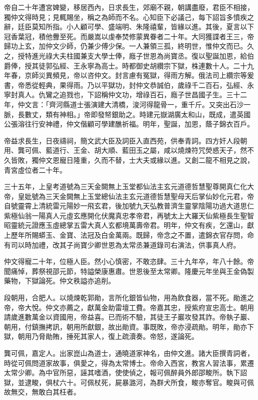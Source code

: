 \begin{pinyinscope}
帝自二十年遭宮婢變，移居西內，日求長生，郊廟不親，朝講盡廢，君臣不相接，獨仲文得時見；見輒賜坐，稱之為師而不名。心知臣下必議己，每下詔旨多憤疾之辭，廷臣莫知所指。小人顧可學、盛端明、朱隆禧輩，皆緣以進。其後，夏言以下冠香葉冠，積他釁至死。而嚴嵩以虔奉焚修蒙異眷者二十年。大同獲諜者王三，帝歸功上玄，加仲文少師，仍兼少傅少保。一人兼領三孤，終明世，惟仲文而已。久之，授特進光祿大夫柱國兼支大學士俸，廕子世恩為尚寶丞。復以聖誕加恩，給伯爵俸，授其徒郭弘經、王永寧為高士。時都御史胡纘宗下獄，株連數十人。二十九年春，京師災異頻見，帝以咨仲文。封言慮有冤獄，得雨方解。俄法司上纘宗等爰書，帝悉從輕典，果得雨。乃以平獄功，封仲文恭誠伯，歲祿千二百石，弘經、永寧封真人。仇鸞之追戮也，下詔稱仲文功，增祿百石，廕子世昌國子生。三十二年，仲文言：「齊河縣道士張演建大清橋，浚河得龍骨一，重千斤。又突出石沙一脈，長數丈，類有神相。」帝即發帑銀助之。時建元嶽湖廣太和山，既成，遣英國公張溶往行安神禮，仲文偕顧可學建醮祈福。明年，聖誕，加恩，蔭子錦衣百戶。

帝益求長生，日夜禱祠，簡文武大臣及詞臣入直西苑，供奉青詞。四方奸人段朝用、龔可佩、藍道行、王金、胡大順、藍田玉之屬，咸以燒煉符咒熒惑天子，然不久皆敗，獨仲文恩寵日隆重，久而不替，士大夫或緣以進。又創二龍不相見之說，青宮虛位者二十年。

三十五年，上皇考道號為三天金闕無上玉堂都仙法主玄元道德哲慧聖尊開真仁化大帝，皇妣號為三天金闕無上玉堂總仙法主玄元道德哲慧聖母天后掌仙妙化元君，帝自號靈霄上清統雷元陽妙一飛玄君，後加號九天弘教普濟生靈掌陰陽功過大道思仁紫極仙翁一陽真人元虛玄應開化伏魔真忠孝帝君，再號太上大羅天仙紫極長生聖智昭靈統元證應玉虛總掌五雷大真人玄都境萬壽帝君。明年，仲文有疾，乞還山，獻上歷年所賜蟒玉、金寶、法冠及白金萬兩。既歸，帝念之不置，遣錦衣官存問，命有司以時加禮，改其子尚寶少卿世恩為太常丞兼道錄司右演法，供事真人府。

仲文得寵二十年，位極人臣。然小心慎密，不敢恣肆。三十九年卒，年八十餘。帝聞痛悼，葬祭視邵元節，特謚榮康惠肅。世恩後至太常卿。隆慶元年坐與王金偽製藥物，下獄論死。仲文秩謚亦追削。

段朝用，合肥人。以燒煉乾郭勛，言所化銀皆仙物，用為飲食器，當不死。勛進之帝，帝大悅。仲文亦薦之，獻萬金助雷壇工費。帝嘉其忠，授紫府宣忠高士。朝用請歲進數萬金以資國用，帝益喜。已而術不驗，其徒王子巖攻發其詐。帝執子巖、朝用，付鎮撫拷訊，朝用所獻銀，故出勛資。事既敗，帝亦浸疏勛。明年，勛亦下獄，朝用乃脅勛賄，捶死其家人，復上疏瀆奏。帝怒，遂論死。

龔可佩，嘉定人。出家崑山為道士，通曉道家神名，由仲文進。諸大臣撰青詞者，時從可佩問道家故事，俱愛之，得為太常博士。帝命入西宮，教宮人習法事，累遷太常少卿。為中官所惡，誣其嗜酒，使使偵之，報可佩醉員外郎邵畯所。執下詔獄，並逮畯，俱杖六十。可佩杖死，屍暴潞河，為群犬所食，畯亦奪官。畯與可佩故無交，無敢白其枉者。


\end{pinyinscope}
